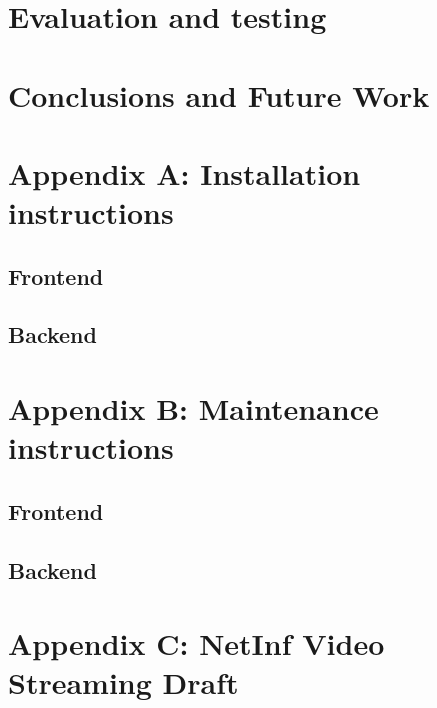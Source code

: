 \documentclass[11pt]{report}
\begin{document}






\chapter{Evaluation and testing}
\label{sec:evaluation}



\chapter{Conclusions and Future Work}
\label{sec:conclusions}



\chapter{Appendix A: Installation instructions}
\section {Frontend}

\section {Backend}

\chapter {Appendix B: Maintenance instructions}

\section{Frontend}

\section{Backend}

\chapter {Appendix C: NetInf Video Streaming Draft}

\end{document}
